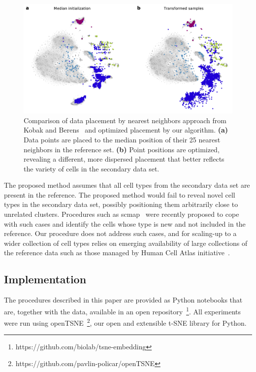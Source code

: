 \documentclass[runningheads]{llncs}
\begin{document}
\begin{figure}[htbp]
\includegraphics[width=\textwidth]{figures/optimization_retina.pdf}
\caption{Comparison of data placement by nearest neighbors approach from Kobak and Berens~\cite{art_of_using_tsne} and optimized placement by our algorithm. {\bf (a)} Data points are placed to the median position of their 25 nearest neighbors in the reference set. {\bf (b)} Point positions are optimized, revealing a different, more dispersed placement that better reflects the variety of cells in the secondary data set.}
\label{fig:optimization}
\end{figure}

The proposed method assumes that all cell types from the secondary data set are present in the reference. The proposed method would fail to reveal novel cell types in the secondary data set, possibly positioning them arbitrarily close to unrelated clusters. Procedures such as scmap~\cite{scmap} were recently proposed to cope with such cases and identify the cells whose type is new and not included in the reference. Our procedure does not address such cases, and for scaling-up to a wider collection of cell types relies on emerging availability of large collections of the reference data such as those managed by Human Cell Atlas initiative~\cite{hca}. 

\subsection{Implementation\label{sec:implementation}}

The procedures described in this paper are provided as Python notebooks that are, together with the data, available in an open repository~\footnote{https://github.com/biolab/tsne-embedding}. All experiments were run using openTSNE~\footnote{https://github.com/pavlin-policar/openTSNE}, our open and extensible t-SNE library for Python.
\end{document}
